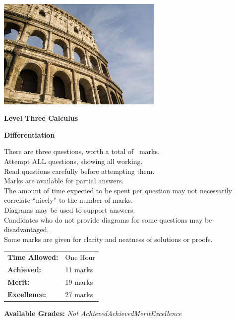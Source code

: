 \documentclass[a4paper,addpoints]{exam}
\begin{document}
\begin{coverpages}

\begin{center}
  \includegraphics[width=0.6\textwidth]{exam-cover-05}

  \vspace{5mm}

  \textbf{\Huge{Level Three Calculus}}

  \vspace{2mm}

  \textbf{\Huge{Differentiation}}
\end{center}

\vspace{5mm}

\noindent
\large{There are three questions, worth a total of \numpoints\ marks.\\
       Attempt ALL questions, showing all working.\\
       Read questions carefully before attempting them.\\
       Marks are available for partial answers.\\
       The amount of time expected to be spent per question may not necessarily correlate ``nicely'' to the number of marks.\\
       Diagrams may be used to support answers.\\
       Candidates who do not provide diagrams for some questions may be disadvantaged.\\
       Some marks are given for clarity and neatness of solutions or proofs.}
\vspace{2mm}

\begin{tabular}{ll}
  \textbf{Time Allowed:}& One Hour\\
  \textbf{Achieved:}& 11 marks\\
  \textbf{Merit:}& 19 marks\\
  \textbf{Excellence:}& 27 marks
\end{tabular}

\vfill

\begin{center}
  \gradetable[h][questions]
  \vspace{2mm}

  \textbf{Available Grades:} \textit{Not Achieved}\quad\textit{Achieved}\quad\textit{Merit}\quad\textit{Excellence}
\end{center}

\end{coverpages}
\end{document}
